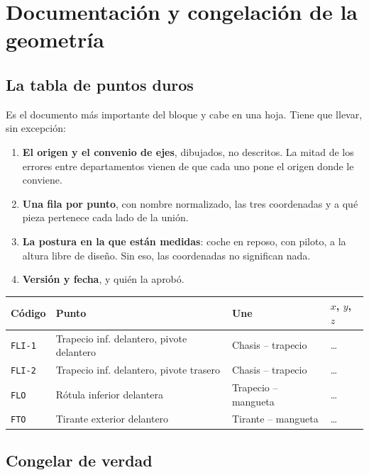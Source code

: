 \section{Documentación y congelación de la geometría}
\label{sec:puntos_duros:04}

\subsection{La tabla de puntos duros}

Es el documento más importante del bloque y cabe en una hoja. Tiene que llevar,
sin excepción:

\begin{enumerate}
  \item \textbf{El origen y el convenio de ejes}, dibujados, no descritos. La
        mitad de los errores entre departamentos vienen de que cada uno pone el
        origen donde le conviene.
  \item \textbf{Una fila por punto}, con nombre normalizado, las tres
        coordenadas y a qué pieza pertenece cada lado de la unión.
  \item \textbf{La postura en la que están medidas}: coche en reposo, con
        piloto, a la altura libre de diseño. Sin eso, las coordenadas no
        significan nada.
  \item \textbf{Versión y fecha}, y quién la aprobó.
\end{enumerate}

\begin{center}
\begin{tabularx}{\textwidth}{@{}llXl@{}}
\toprule
\textbf{Código} & \textbf{Punto} & \textbf{Une} & \textbf{$x$, $y$, $z$} \\
\midrule
\texttt{FLI-1} & Trapecio inf. delantero, pivote delantero & Chasis -- trapecio & \ldots \\
\texttt{FLI-2} & Trapecio inf. delantero, pivote trasero & Chasis -- trapecio & \ldots \\
\texttt{FLO}   & Rótula inferior delantera & Trapecio -- mangueta & \ldots \\
\texttt{FTO}   & Tirante exterior delantero & Tirante -- mangueta & \ldots \\
\bottomrule
\end{tabularx}
\end{center}

\subsection{Congelar de verdad}

